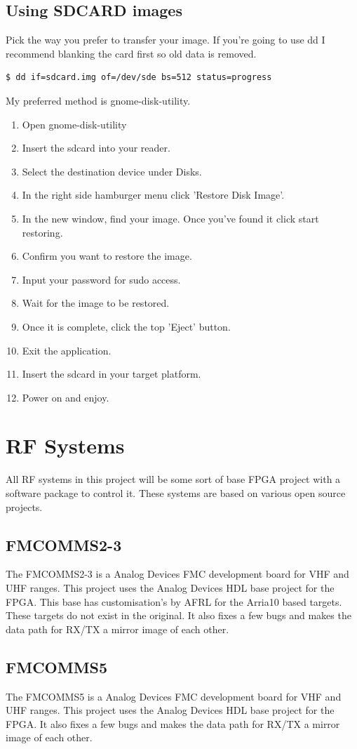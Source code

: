 \subsection{Using SDCARD images}
\par
Pick the way you prefer to transfer your image. If you're going to use dd I recommend blanking the card first so old data is removed.
\begin{lstlisting}[language=bash]
$ dd if=sdcard.img of=/dev/sde bs=512 status=progress
\end{lstlisting}
My preferred method is gnome-disk-utility.
\begin{enumerate}
\item Open gnome-disk-utility
\item Insert the sdcard into your reader.
\item Select the destination device under Disks.
\item In the right side hamburger menu click 'Restore Disk Image'.
\item In the new window, find your image. Once you've found it click start restoring.
\item Confirm you want to restore the image.
\item Input your password for sudo access.
\item Wait for the image to be restored.
\item Once it is complete, click the top 'Eject' button.
\item Exit the application.
\item Insert the sdcard in your target platform.
\item Power on and enjoy.
\end{enumerate}

\section{RF Systems}

\par
All RF systems in this project will be some sort of base FPGA project with a software package to control it.
These systems are based on various open source projects.

\subsection{FMCOMMS2-3}

\par
The FMCOMMS2-3 is a Analog Devices FMC development board for VHF and UHF ranges. This project uses the Analog
Devices HDL base project for the FPGA. This base has customisation's by AFRL for the Arria10 based targets. These
targets do not exist in the original. It also fixes a few bugs and makes the data path for RX/TX a mirror image of
each other.

\subsection{FMCOMMS5}

\par
The FMCOMMS5 is a Analog Devices FMC development board for VHF and UHF ranges. This project uses the Analog
Devices HDL base project for the FPGA. It also fixes a few bugs and makes the data path for RX/TX a mirror image of
each other.
